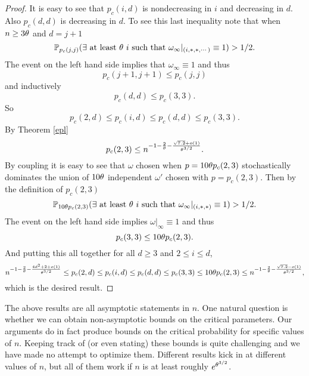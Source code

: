 \begin{proof}
It is easy to see that 
$p_c(i,d)$ is nondecreasing in $i$ and decreasing in $d$. Also 
$p_c(d,d)$ is decreasing in $d$. To see this last inequality note that 
when $n \geq 3 \theta$ and $d=j+1$
$$\mathbb{P}_{ p_c(j,j)} (\exists \text{ at least }  \theta \ i \text{ such that 
$\omega_\infty|_{(i,*,*, \cdots )}\equiv1$})>1/2.
$$
The event on the left hand side implies that $\omega_\infty\equiv1$ and 
thus 
$$p_c(j+1,j+1)\leq p_c(j,j)$$ 
and inductively
$$p_c(d,d) \leq p_c(3,3).$$ 
So 
$$p_c(2,d) \leq p_c(i,d) \leq p_c(d,d) \leq p_c(3,3) .$$
By Theorem \ref{epl}
$$p_c(2,3) \leq
n^{-1 - \frac{2}{\theta} - \frac{\sqrt{7.2}+o(1)}{\theta^{3/2}}}.
$$
By coupling it is easy to see that $\omega$ chosen when $p=10 \theta p_c(2,3)$ stochastically dominates the union of $10 \theta$ independent $\omega'$ 
chosen with $p=p_c(2,3)$. Then by the definition of $p_c(2,3)$
$$\mathbb{P}_{10 \theta p_c(2,3)} (\exists \text{ at least } \theta \ i \text{ such that 
$\omega_\infty|_{(i,*,*)}\equiv 1$})>1/2.
$$
The event on the left hand side implies $\omega|_{\infty}\equiv1$ and thus 
\begin{equation}\label{cloudforestcafe}
p_c(3,3) \leq 10 \theta p_c(2,3).
\end{equation}
And putting this all together for all $d \geq 3$ and $2 \leq i \leq d$,
$$n^{-1 - \frac{2}{\theta} - \frac{4d^2+2+o(1)}{\theta^{3/2}}} \leq
p_c(2,d) \leq p_c(i,d) \leq p_c(d,d) \leq p_c(3,3) \leq 10 \theta p_c(2,3) \leq
n^{-1 - \frac{2}{\theta} - \frac{\sqrt{7.2}-o(1)}{\theta^{3/2}}},
$$
which is the desired result.
\end{proof}


\begin{remark} The above results are all asymptotic statements in $n$. One natural question is whether we can obtain non-asymptotic bounds on the critical parameters.  Our arguments do in fact produce bounds on the critical probability for specific values of $n$.  Keeping track of (or even stating) these bounds is quite challenging and we have made no attempt to optimize them. Different results kick in at different values of $n$, but all of them 
work if  $n$ is at least roughly $e^{\theta^{3/2}}$. 
\end{remark}

\begin{comment}
\begin{remark}The above theorems hold for $n$ sufficiently large. We could calculate how large $n$ needs to be. Doing so involves a close look at the constants in the following sections. These constants depend on $\threshold$. In order to get the all the proofs to work we must choose $n$ to be roughly $e^{\threshold^{3/2}}$. As our calculations were optimized for ease of calculation, not to get the best possible bounds, we do not worry about for exactly which values of $n$ our theorems apply.
\end{remark}
\end{comment}

